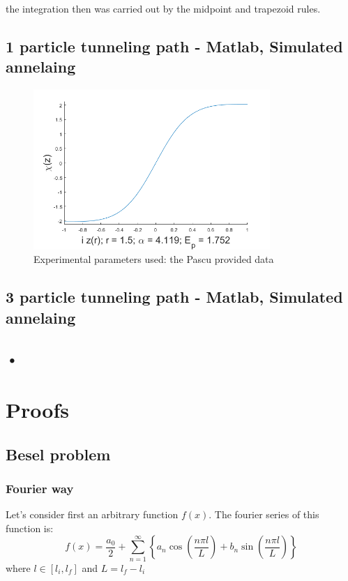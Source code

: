 \documentclass[12pt,a4paper]{article}
\numberwithin{equation}{section}
\begin{document}
the integration then was carried out by the midpoint and trapezoid rules.




\subsection{1 particle tunneling path - Matlab, Simulated annelaing}

\begin{figure}[H]
\centering
\includegraphics[width = 0.8\textwidth]{1partkhi}
\caption{Experimental parameters used: the Pascu provided data}
\end{figure}

\subsection{3 particle tunneling path - Matlab, Simulated annelaing}


\subsection{•}

\newpage
\section{Proofs}
\subsection{Besel problem}

\subsubsection*{Fourier way}
Let's consider first an arbitrary function $f(x)$. The fourier series of this function is:
\begin{equation}
f(x) = \frac{a_0}{2} + \sum_{n=1}^\infty \left\lbrace a_n \cos\left( \frac{n \pi l}{L}  \right) + b_n \sin \left(  \frac{n \pi l}{L} \right)  \right\rbrace
\end{equation}
where $l\in [l_i,l_f]$ and $L = l_f - l_i$
\end{document}
